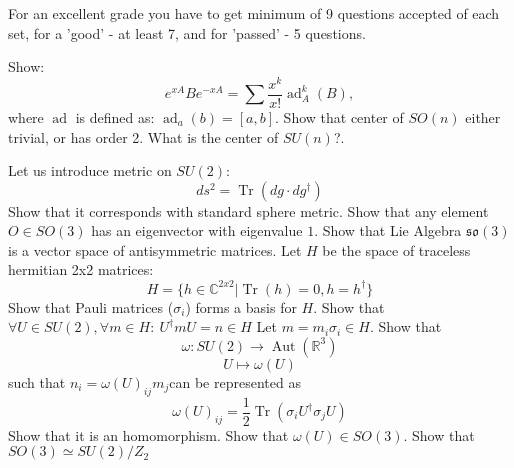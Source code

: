 \documentclass[12pt]{article}
\DeclareMathOperator{\Tr}{Tr}
\DeclareMathOperator{\Aut}{Aut}
\DeclareMathOperator{\ad}{ad}
\begin{document}

For an excellent grade you have to get minimum of 9 questions accepted  of each set, for a 'good' - at least 7, and for 'passed' - 5 questions.	

	\p
	Show:
	$$ e^{xA}Be^{-xA} = \sum \frac{x^k}{x!} \ad_{A}^k (B),$$
	where $\ad$ is defined as: $\ad_a(b) = [a,b]$. 
	\ep
	\p Show that center of  $SO(n)$ either trivial, or has order 2. What is the center of $SU(n)$?.
	\ep


	\p
	Let us introduce metric on $SU(2)$:
	$$ds^2 = \Tr  (dg\cdot dg^\dagger)$$
	Show that it corresponds with standard sphere metric.
	\ep
	\p
	Show that any element $O \in SO(3)$ has an eigenvector with eigenvalue $1$.
	\ep
	\p
	Show that Lie Algebra $\mathfrak{so}(3)$  is a vector space of antisymmetric matrices. 
	\ep
	Let $H$ be the space of traceless hermitian 2x2 matrices:
	$$H = \{ h \in \mathbb{C}^{2x2} | \Tr(h)=0, h=h^\dagger  \}$$
	\p
	Show  that Pauli matrices ($\sigma_i$)  forms a basis for $H$.
	Show that $\forall U \in SU(2), \forall m \in H: \ U^\dagger m U = n \in H$
	\ep
	\p 
	Let $m=m_i \sigma_i \in H$. Show that
	$$\omega: SU(2) \to \Aut(\mathbb{R}^3)$$
	$$U \mapsto \omega(U)$$
	such that $n_i = \omega(U)_{ij} m_j$can be represented as $$\omega(U)_{ij} = \frac 1 2 \Tr(\sigma_i U^\dagger \sigma_j U) $$ Show that it is an homomorphism.
	\ep
	\p
   Show that $\omega(U) \in SO(3)$.
	\ep
	\p 	
	Show that $SO(3) \simeq SU(2) / Z_2$
	\ep
\end{document}
